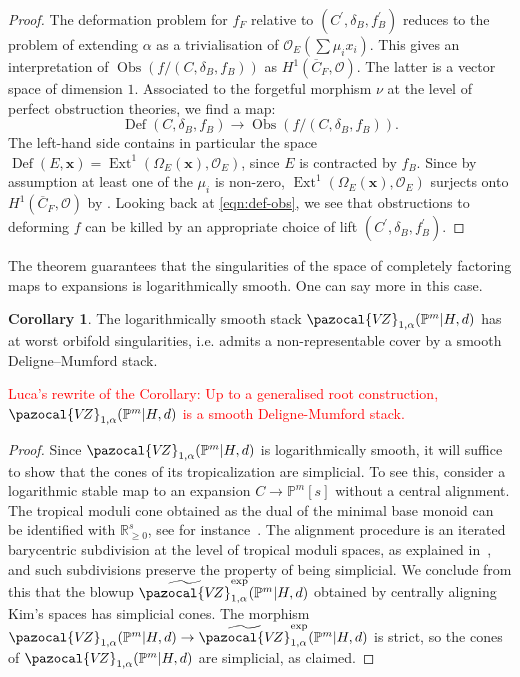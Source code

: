 \documentclass[11pt]{amsart}
\newcommand{\VZ}{\pazocal{V\!Z}}
\newcommand{\OO}{\mathcal{O}}
\renewcommand{\to}{\rightarrow}
\theoremstyle{definition}
\newtheorem{cor}[thm]{Corollary}
\theoremstyle{definition}
\begin{document}
\begin{proof}
The deformation problem for $f_F$ relative to $(C^\prime,\delta_B,f_B^\prime)$ reduces to the problem of extending $\alpha$ as a trivialisation of $\OO_E(\sum\mu_i x_i)$. This gives an interpretation of $\operatorname{Obs}(f/(C,\delta_B,f_B))$ as $H^1(\overline C_F,\OO)$. The latter is a vector space of dimension $1$. Associated to the forgetful morphism $\nu$ at the level of perfect obstruction theories, we find a map:
\begin{equation}\label{eqn:def-obs}\operatorname{Def}(C,\delta_B,f_B)\to \operatorname{Obs}(f/(C,\delta_B,f_B)).\end{equation}
The left-hand side contains in particular the space $\operatorname{Def}(E,\mathbf{x})=\operatorname{Ext}^1(\Omega_E(\mathbf x),\OO_E)$, since $E$ is contracted by $f_B$. Since by assumption at least one of the $\mu_i$ is non-zero, $\operatorname{Ext}^1(\Omega_E(\mathbf x),\OO_E)$ surjects onto $H^1(\overline C_F,\OO)$ by \cite[Corollary 3.5.3]{RSPW2}. Looking back at \eqref{eqn:def-obs}, we see that obstructions to deforming $f$ can be killed by an appropriate choice of lift $(C^\prime,\delta_B,f_B^\prime)$.


\end{proof}

The theorem guarantees that the singularities of the space of completely factoring maps to expansions is logarithmically smooth. One can say more in this case.

\begin{cor}
The logarithmically smooth stack $\VZ_{1,\alpha}(\mathbb P^m|H,d)$ has at worst orbifold singularities, i.e. admits a non-representable cover by a smooth Deligne--Mumford stack.
\end{cor}

\textcolor{red}{Luca's rewrite of the Corollary: Up to a generalised root construction, $\VZ_{1,\alpha}(\mathbb P^m|H,d)$ is a smooth Deligne-Mumford stack.}

\begin{proof}
Since $\VZ_{1,\alpha}(\mathbb P^m|H,d)$ is logarithmically smooth, it will suffice to show that the cones of its tropicalization are simplicial. To see this, consider a logarithmic stable map to an expansion $C\to \mathbb P^m[s]$ without a central alignment. The tropical moduli cone obtained as the dual of the minimal base monoid can be identified with $\mathbb R_{\geq 0}^{s}$, see for instance~\cite[Section~2.2]{ChenDegeneration}. The alignment procedure is an iterated barycentric subdivision at the level of tropical moduli spaces, as explained in~\cite[Section 4.6]{RSPW}, and such subdivisions preserve the property of being simplicial. We conclude from this that the blowup $\widetilde{\VZ}^{\mathrm{exp}}_{1,\alpha}(\mathbb P^m|H,d)$ obtained by centrally aligning Kim's spaces has simplicial cones. The morphism $\VZ_{1,\alpha}(\mathbb P^m|H,d)\to \widetilde{\VZ}^{\mathrm{exp}}_{1,\alpha}(\mathbb P^m|H,d)$ is strict, so the cones of $\VZ_{1,\alpha}(\mathbb P^m|H,d)$ are simplicial, as claimed.
\end{proof}
\end{document}
